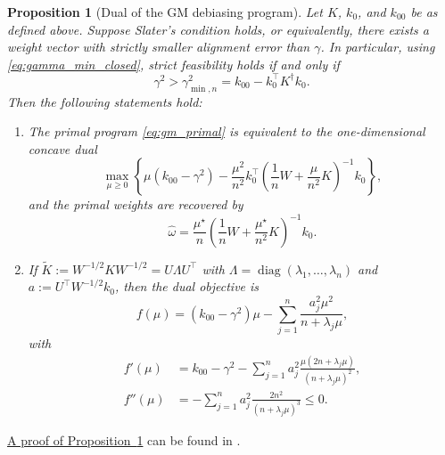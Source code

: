 \documentclass[11pt]{article}
\newtheorem{proposition}{Proposition}[section]
\begin{document}
\begin{proposition}[Dual of the GM debiasing program]
\label{prop:gm_dual}
Let $K$, $k_0$, and $k_{00}$ be as defined above. Suppose Slater's condition holds, or equivalently, there exists a weight vector with strictly smaller alignment error than $\gamma$. In particular, using \eqref{eq:gamma_min_closed}, strict feasibility holds if and only if
\[
  \gamma^2>\gamma_{\min,n}^2
  =k_{00}-k_0^\top K^\dagger k_0.
\]
Then the following statements hold:
\begin{enumerate}[label=(\roman*)]

  \item The primal program \eqref{eq:gm_primal} is equivalent to the one-dimensional concave dual
  \begin{equation}
    \max_{\mu\ge0}
    \left\{
    \mu(k_{00}-\gamma^2)
    -\frac{\mu^2}{n^2}k_0^\top
    \left(\frac1nW+\frac{\mu}{n^2}K\right)^{-1}k_0
    \right\},
    \label{eq:gm_dual}
  \end{equation}
  and the primal weights are recovered by
  \begin{equation}
    \widehat\omega
    =\frac{\mu^\star}{n}
    \left(\frac1nW+\frac{\mu^\star}{n^2}K\right)^{-1}k_0.
    \label{eq:dual_weight_recovery}
  \end{equation}

  \item If $\widetilde K:=W^{-1/2}KW^{-1/2}=U\Lambda U^\top$ with
  $\Lambda=\operatorname{diag}(\lambda_1,\ldots,\lambda_n)$ and
  $a:=U^\top W^{-1/2}k_0$, then the dual objective is
  \begin{equation}
    f(\mu)
    =(k_{00}-\gamma^2)\mu
    -\sum_{j=1}^n\frac{a_j^2\mu^2}{n+\lambda_j\mu},
    \label{eq:dual_eigenbasis}
  \end{equation}
  with
  \begin{align}
    f'(\mu)
    &=k_{00}-\gamma^2-
    \sum_{j=1}^n a_j^2
    \frac{\mu(2n+\lambda_j\mu)}
    {(n+\lambda_j\mu)^2},
    \label{eq:dual_first_derivative}\\
    f''(\mu)
    &=-\sum_{j=1}^n
    a_j^2\frac{2n^2}
    {(n+\lambda_j\mu)^3}
    \leq 0.
    \label{eq:dual_second_derivative}
  \end{align}

\end{enumerate}
\end{proposition}



\hyperref[proof:gm_dual]{A proof of Proposition~\ref*{prop:gm_dual}} can be found in . 
\end{document}
